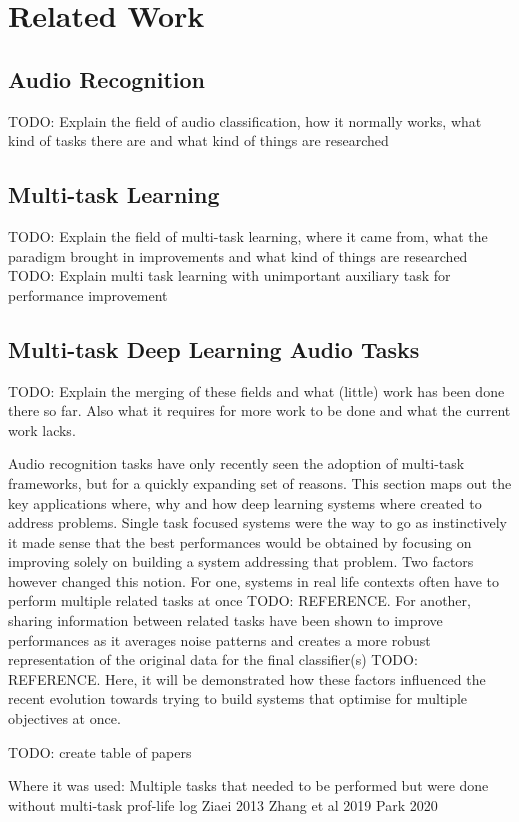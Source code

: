 \chapter{Related Work}

\section{Audio Recognition}
TODO: Explain the field of audio classification, how it normally works, what kind of tasks there are and what kind of things are researched

\section{Multi-task Learning}
TODO: Explain the field of multi-task learning, where it came from, what the paradigm brought in improvements and what kind of things are researched
TODO: Explain multi task learning with unimportant auxiliary task for performance improvement

\section{Multi-task Deep Learning Audio Tasks}
TODO: Explain the merging of these fields and what (little) work has been done there so far. Also what it requires for more work to be done and what the current work lacks.

Audio recognition tasks have only recently seen the adoption of multi-task frameworks, but for a quickly expanding set of reasons. This section maps out the key applications where, why and how deep learning systems where created to address problems. Single task focused systems were the way to go as instinctively it made sense that the best performances would be obtained by focusing on improving solely on building a system addressing that problem. Two factors however changed this notion. For one, systems in real life contexts often have to perform multiple related tasks at once TODO: REFERENCE. For another, sharing information between related tasks have been shown to improve performances as it averages noise patterns and creates a more robust representation of the original data for the final classifier(s) TODO: REFERENCE. Here, it will be demonstrated how these factors influenced the recent evolution towards trying to build systems that optimise for multiple objectives at once. 

TODO: create table of papers

Where it was used:
Multiple tasks that needed to be performed but were done without multi-task
prof-life log Ziaei 2013
Zhang et al 2019
Park 2020

